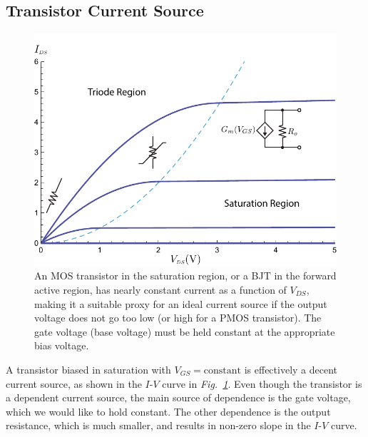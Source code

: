 \subsection{Transistor Current Source}
\begin{figure}[tb]
\centering
\includegraphics[width=.75\columnwidth]{mos_building_block.pdf}
\caption{An MOS transistor in the saturation region, or a BJT in the forward active region, has nearly constant current as a function of $V_{DS}$, making it a suitable proxy for an ideal current source if the output voltage does not go too low (or high for a PMOS transistor).  The gate voltage (base voltage) must be held constant at the appropriate bias voltage.}
\label{fig:mos_building_block.pdf}
\end{figure}
A transistor biased in saturation with $V_{GS} = \text{constant}$ is effectively a decent current source, as shown in the $I$-$V$ curve in \emph{Fig.~\ref{fig:mos_building_block.pdf}}.  Even though the transistor is a dependent current source, the main source of dependence is the gate voltage, which we would like to hold constant.  The other dependence is the output resistance, which is much smaller, and results in non-zero slope in the $I$-$V$ curve. 
